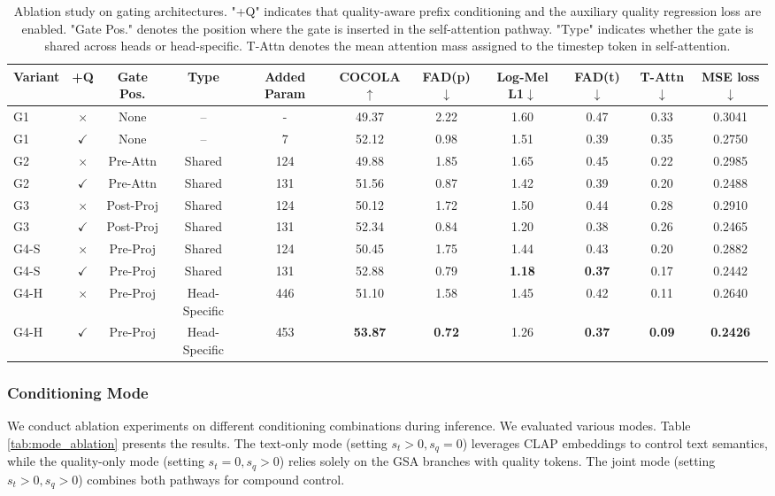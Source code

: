\documentclass[lettersize,journal]{IEEEtran}
\begin{document}
\begin{table}[t!]
      \centering
      \caption{Ablation study on gating architectures. "+Q"
  indicates that quality-aware prefix conditioning and the auxiliary
  quality regression loss are enabled. "Gate Pos." denotes the
  position where the gate is inserted in the self-attention pathway.
  "Type" indicates whether the gate is shared across heads or
  head-specific. T-Attn denotes the mean attention mass assigned to
  the timestep token in self-attention.}
      \begin{tabular}{lccc|ccccccc}
          \toprule
Variant & +Q & Gate Pos. & Type & Added Param &COCOLA$\uparrow$ & FAD(p)$\downarrow$ & Log-Mel L1$\downarrow$ & FAD(t)$\downarrow$ & T-Attn$\downarrow$ & MSE loss$\downarrow$ \\
          \midrule
          G1 & $\times$ & None & -- & - & 49.37 & 2.22 & 1.60 & 0.47 & 0.33 & 0.3041 \\
          G1 & $\checkmark$ & None & -- & 7 & 52.12 & 0.98 & 1.51 & 0.39 & 0.35& 0.2750 \\
          G2 & $\times$ & Pre-Attn & Shared & 124 & 49.88 & 1.85 & 1.65 & 0.45 & 0.22 & 0.2985 \\
          G2 & $\checkmark$ & Pre-Attn & Shared & 131 & 51.56 & 0.87 & 1.42 & 0.39 & 0.20 & 0.2488 \\
          G3 & $\times$ & Post-Proj & Shared & 124 & 50.12 & 1.72 & 1.50 & 0.44 & 0.28 & 0.2910 \\
          G3 & $\checkmark$ & Post-Proj & Shared & 131 & 52.34 & 0.84 & 1.20 & 0.38 & 0.26 & 0.2465 \\
          G4-S & $\times$ & Pre-Proj & Shared & 124 & 50.45 & 1.75 & 1.44 & 0.43 & 0.20 & 0.2882 \\
          G4-S & $\checkmark$ & Pre-Proj & Shared & 131 & 52.88 & 0.79& \textbf{1.18} & \textbf{0.37} & 0.17 & 0.2442 \\
          G4-H & $\times$ & Pre-Proj & Head-Specific & 446 & 51.10 & 1.58 & 1.45 & 0.42 & 0.11 & 0.2640 \\
          G4-H & $\checkmark$ & Pre-Proj & Head-Specific & 453 & \textbf{53.87} & \textbf{0.72} & 1.26 & \textbf{0.37} & \textbf{0.09} & \textbf{0.2426} \\
          \bottomrule
      \end{tabular}
      \label{tab:gating_ablation}
\end{table}

\subsubsection{Conditioning Mode}
We conduct ablation experiments on different conditioning combinations during inference. We evaluated various modes. Table \ref{tab:mode_ablation} presents the results. The text-only mode (setting $s_t > 0, s_q = 0$) leverages CLAP embeddings to control text semantics, while the quality-only mode (setting $s_t = 0, s_q > 0$) relies solely on the GSA branches with quality tokens. The joint mode (setting $s_t > 0, s_q > 0$) combines both pathways for compound control.
\end{document}
